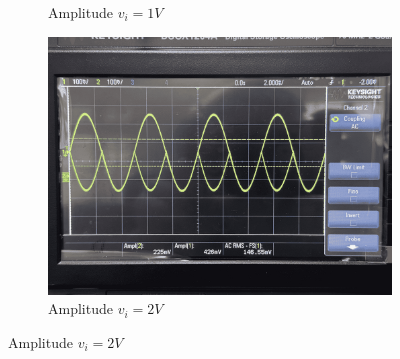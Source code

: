\begin{figure}[H]
\begin{subfigure}{0.3\linewidth}
            \caption{Amplitude $v_i=1V$}
            \label{wave:13-AC1}
        \end{subfigure}
        \begin{subfigure}{0.3\linewidth}
            \includegraphics[width=1\linewidth]{Experiment_13/Images/13_2v.jpg}
            \caption{Amplitude $v_i=2V$}
            \label{wave:13-AC2}
        \end{subfigure}


\end{figure}
